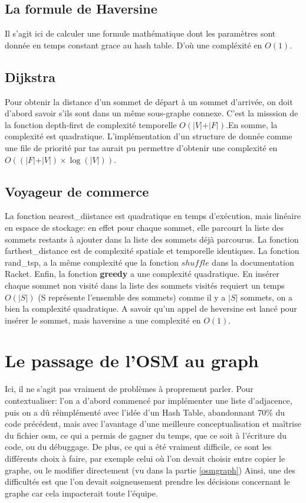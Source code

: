 \documentclass[french]{article}
\begin{document}
\subsection{La formule de Haversine}
Il s'agit ici de calculer une formule mathématique dont les paramètres sont donnée en temps constant grace au hash table. D'où une  compléxité en $O(1)$.
\subsection{Dijkstra}
Pour obtenir la distance d'un sommet de départ à un sommet d'arrivée, on doit d'abord savoir s'ils sont dans un même sous-graphe connexe. C'est la misssion de la fonction depth-first de complexité temporelle $O(\vert V\vert+\vert F\vert)$.En somme, la complexité est quadratique.
L'implémentation d'un structure de donnée comme une file de priorité par tas aurait pu permettre d'obtenir une complexité en $O((\vert F\vert+\vert V\vert)\times\log(\vert V\vert))$.

\subsection{Voyageur de commerce}
La fonction nearest\_diistance est quadratique en temps d'exécution, mais linéaire en espace de stockage: en effet pour chaque sommet, elle parcourt la liste des sommets restants à ajouter dans la liste des sommets déjà parcourus. La fonction farthest\_distance est de complexité spatiale et temporelle identiques.\newline
La fonction rand\_tsp, a la même complexité que la fonction $shuffle$ dans la documentation Racket.\newline
Enfin, la fonction \textbf{greedy} a une complexité quadratique. En insérer chaque sommet non visité  dans la liste des sommets visités requiert un temps $O(\vert S\vert)$ (S représente l'ensemble des sommets) comme il y a $\vert S\vert$ sommets, on a bien la complexité quadratique. A savoir qu'un appel de heversine est lancé pour insérer le sommet, mais haversine a une complexité en $O(1)$.\\
\section{Le passage de l'OSM au graph} 
Ici, il ne s'agit pas vraiment de problèmes à proprement parler. Pour contextualiser: l'on a d'abord commencé par implémenter une liste d'adjacence, puis on a dû réimplémenté avec l'idée d'un Hash Table, abandonnant 70\% du code précédent, mais avec l'avantage d'une meilleure conceptualisation et maîtrise du fichier osm, ce qui a permis de gagner du temps, que ce soit à l'écriture du code, ou du débuggage. De plus, ce qui a été vraiment difficile, ce sont les différents choix à faire, par exemple celui où l'on devait choisir entre copier le graphe, ou le modifier directement (vu dans la partie \ref{osmgraph})
Ainsi, une des difficultés est que l'on devait soigneusement prendre les décisions concernant le graphe car cela impacterait toute l'équipe.
\end{document}
